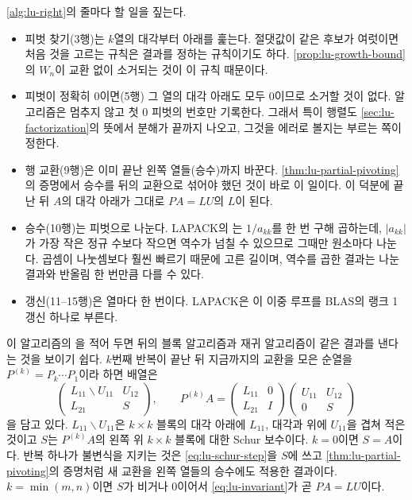 \cref{alg:lu-right}의 줄마다 할 일을 짚는다.
\begin{itemize}
\item 피벗 찾기(3행)는 $k$열의 대각부터 아래를 훑는다. 절댓값이 같은 후보가 여럿이면 처음 것을 고르는 규칙은 결과를 정하는 규칙이기도 하다. \cref{prop:lu-growth-bound}의 $W_n$이 교환 없이 소거되는 것이 이 규칙 때문이다.
\item 피벗이 정확히 $0$이면(5행) 그 열의 대각 아래도 모두 $0$이므로 소거할 것이 없다. 알고리즘은 멈추지 않고 첫 $0$ 피벗의 번호만 기록한다. 그래서 특이 행렬도 \cref{sec:lu-factorization}의 뜻에서 분해가 끝까지 나오고, 그것을 에러로 볼지는 부르는 쪽이 정한다.
\item 행 교환(9행)은 이미 끝난 왼쪽 열들(승수)까지 바꾼다. \cref{thm:lu-partial-pivoting}의 증명에서 승수를 뒤의 교환으로 섞어야 했던 것이 바로 이 일이다. 이 덕분에 끝난 뒤 $A$의 대각 아래가 그대로 $PA=LU$의 $L$이 된다.
\item 승수(10행)는 피벗으로 나눈다. LAPACK의 는 $1/a_{kk}$를 한 번 구해 곱하는데, $|a_{kk}|$가 가장 작은 정규 수보다 작으면 역수가 넘칠 수 있으므로 그때만 원소마다 나눈다. 곱셈이 나눗셈보다 훨씬 빠르기 때문에 고른 길이며, 역수를 곱한 결과는 나눈 결과와 반올림 한 번만큼 다를 수 있다.
\item 갱신(11--15행)은 열마다  한 번이다. LAPACK은 이 이중 루프를 BLAS의 랭크 1 갱신  하나로 부른다.
\end{itemize}

이 알고리즘의 을 적어 두면 뒤의 블록 알고리즘과 재귀 알고리즘이 같은 결과를 낸다는 것을 보이기 쉽다. $k$번째 반복이 끝난 뒤 지금까지의 교환을 모은 순열을 $P^{(k)}=P_k\cdots P_1$이라 하면 배열은
\begin{equation}
\label{eq:lu-invariant}
\begin{pmatrix}L_{11}\backslash U_{11}&U_{12}\\L_{21}&S\end{pmatrix},\qquad
P^{(k)}A=\begin{pmatrix}L_{11}&0\\L_{21}&I\end{pmatrix}\begin{pmatrix}U_{11}&U_{12}\\0&S\end{pmatrix}
\end{equation}
을 담고 있다. $L_{11}\backslash U_{11}$은 $k\times k$ 블록의 대각 아래에 $L_{11}$, 대각과 위에 $U_{11}$을 겹쳐 적은 것이고 $S$는 $P^{(k)}A$의 왼쪽 위 $k\times k$ 블록에 대한 Schur 보수이다. $k=0$이면 $S=A$이다. 반복 하나가 불변식을 지키는 것은 \eqref{eq:lu-schur-step}을 $S$에 쓰고 \cref{thm:lu-partial-pivoting}의 증명처럼 새 교환을 왼쪽 열들의 승수에도 적용한 결과이다. $k=\min(m,n)$이면 $S$가 비거나 $0$이어서 \eqref{eq:lu-invariant}가 곧 $PA=LU$이다.


